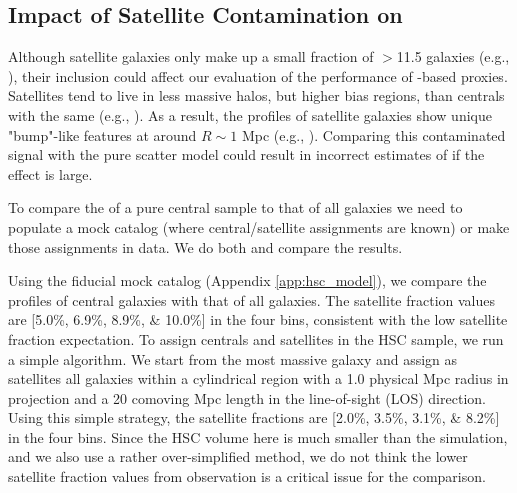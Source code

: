 \documentclass[fleqn,usenatbib,useAMS,english]{mnras}
\begin{document}
\subsection{Impact of Satellite Contamination on \dsigma{}}
    \label{sec:satellite}

    Although satellite galaxies only make up a small fraction of $>$11.5 galaxies
    (e.g., \citealt{More2015, vanUitert2016, Huang2020}), their inclusion could affect our evaluation
    of the performance of \mstar{}-based \mvir{} proxies.
    Satellites tend to live in less massive halos, but higher bias regions, than centrals
    with the same \mstar{}
    (e.g., \citealt{vanUitert2016, Niemiec2017, Niemiec2019, Dvornik2020, Engler2021}).
    As a result, the \dsigma{} profiles of satellite galaxies show unique "bump"-like features at around
    $R \sim 1$ Mpc (e.g., \citealt{LiShan2014, LiShan2016, Sifon2015, Sifon2018}).
    Comparing this contaminated signal with the pure scatter model could result in incorrect
    estimates of \sigmh{} if the effect is large.

    To compare the \dsigma{} of a pure central sample to that of all galaxies we need to
    populate a mock catalog (where central/satellite assignments are known) or make those
    assignments in data. We do both and compare the results.
    
    Using the fiducial mock catalog (Appendix \ref{app:hsc_model}), we compare the
    \dsigma{} profiles of central galaxies with that of all galaxies.
    The satellite fraction values are [5.0\%, 6.9\%, 8.9\%, \& 10.0\%] in the four \topn{} bins,
    consistent with the low satellite fraction expectation.
    To assign centrals and satellites in the HSC sample, we run a simple algorithm.
    We start from the most massive \mmax{} galaxy and assign as satellites all galaxies
    within a cylindrical region with a 1.0 physical Mpc radius in projection and a 20 
    comoving Mpc length in the line-of-sight (LOS) direction.
    Using this simple strategy, the satellite fractions are [2.0\%, 3.5\%, 3.1\%, \& 8.2\%] 
    in the four bins.
    Since the HSC volume here is much smaller than the  simulation, and we also use 
    a rather over-simplified method, we do not think the lower satellite fraction values
    from observation is a critical issue for the comparison.
\end{document}
